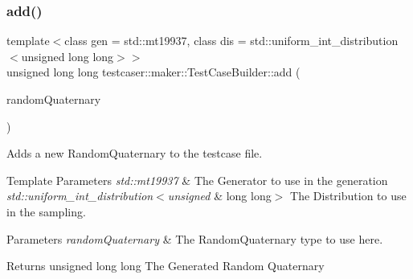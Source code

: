 \subsubsection{\texorpdfstring{add()}{add()}\hspace{0.1cm}{\footnotesize\ttfamily [7/11]}}
{\footnotesize\ttfamily template$<$class gen  = std\+::mt19937, class dis  = std\+::uniform\+\_\+int\+\_\+distribution$<$unsigned long long$>$$>$ \\
unsigned long long testcaser\+::maker\+::\+Test\+Case\+Builder\+::add (\begin{DoxyParamCaption}\item[{\hyperlink{structtestcaser_1_1maker_1_1types_1_1RandomQuaternary}{types\+::\+Random\+Quaternary}$<$ gen, dis $>$ \&}]{random\+Quaternary }\end{DoxyParamCaption})\hspace{0.3cm}{\ttfamily [inline]}}



Adds a new Random\+Quaternary to the testcase file. 


\begin{DoxyTemplParams}{Template Parameters}
{\em std\+::mt19937} & The Generator to use in the generation \\
\hline
{\em std\+::uniform\+\_\+int\+\_\+distribution$<$unsigned} & long long$>$ The Distribution to use in the sampling. \\
\hline
\end{DoxyTemplParams}

\begin{DoxyParams}{Parameters}
{\em random\+Quaternary} & The Random\+Quaternary type to use here. \\
\hline
\end{DoxyParams}
\begin{DoxyReturn}{Returns}
unsigned long long The Generated Random Quaternary 
\end{DoxyReturn}
\mbox{\label{classtestcaser_1_1maker_1_1TestCaseBuilder_a8c036fe574ac265ebbe37225727047e6}} 
